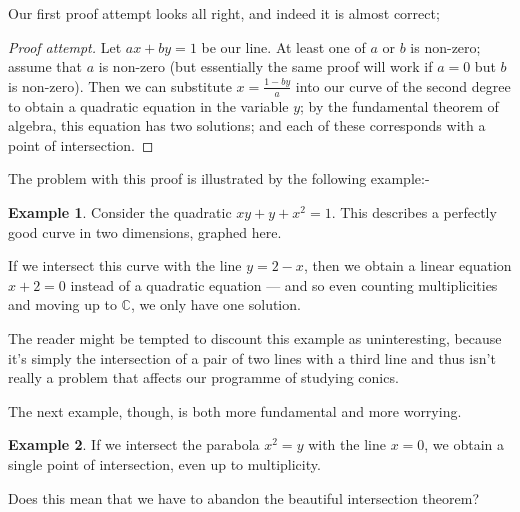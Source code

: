 \documentclass[a4paper,leqno,10pt]{article}
\theoremstyle{exercise}
\theoremstyle{plain}
\theoremstyle{definition}
\newtheorem*{ex}{Example}
\theoremstyle{remark}
\begin{document}
Our first proof attempt looks all right, and indeed it is almost correct;

\begin{proof}[Proof attempt]
  Let $ ax + by = 1 $ be our line. At least one of $ a $ or $ b $ is non-zero; assume that $ a $ is
  non-zero (but essentially the same proof will work if $ a = 0 $ but $ b $ is non-zero). Then we
  can substitute $ x = \frac{1 - by}{a} $ into our curve of the second degree to obtain a quadratic
  equation in the variable $ y $; by the fundamental theorem of algebra, this equation has two solutions;
  and each of these corresponds with a point of intersection.
\end{proof}

The problem with this proof is illustrated by the following example:-
\begin{ex}
  Consider the quadratic $ xy + y + x^2 = 1 $. This describes a perfectly good curve in two dimensions, graphed here.
  \begin{center}
  \end{center}
  If we intersect this curve with the line $ y = 2 - x $, then we obtain a linear equation $ x + 2 = 0 $ instead of a quadratic
  equation --- and so even counting multiplicities and moving up to $ \mathbb{C} $, we only have one solution.
\end{ex}

The reader might be tempted to discount this example as uninteresting, because it's simply the intersection of a pair of two lines
with a third line and thus isn't really a problem that affects our programme of studying conics.

The next example, though, is both more fundamental and more worrying.
\begin{ex}
  If we intersect the parabola $ x^2 = y $ with the line $ x = 0 $, we obtain a single point of intersection, even
  up to multiplicity.
\end{ex}

Does this mean that we have to abandon the beautiful intersection theorem?
\end{document}
